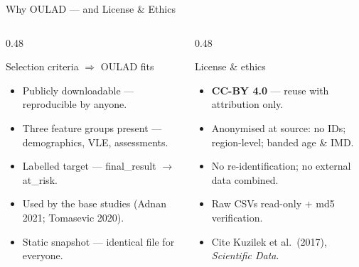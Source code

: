 \documentclass[aspectratio=169,10pt]{beamer}
\newcommand{\tcode}[1]{{\ttfamily #1}}
\begin{document}
\begin{frame}{Why OULAD — and License \& Ethics}
  \begin{columns}[t,onlytextwidth]
    \begin{column}{0.48\textwidth}
      \begin{block}{Selection criteria $\Rightarrow$ OULAD fits}
        \scriptsize
        \begin{itemize}\setlength\itemsep{0.25em}
          \item Publicly downloadable — reproducible by anyone.
          \item Three feature groups present — demographics, VLE, assessments.
          \item Labelled target — \tcode{final\_result} $\to$ \tcode{at\_risk}.
          \item Used by the base studies (Adnan 2021; Tomasevic 2020).
          \item Static snapshot — identical file for everyone.
        \end{itemize}
      \end{block}
    \end{column}
    \begin{column}{0.48\textwidth}
      \begin{block}{License \& ethics}
        \scriptsize
        \begin{itemize}\setlength\itemsep{0.25em}
          \item \textbf{CC-BY 4.0} — reuse with attribution only.
          \item Anonymised at source: no IDs; region-level; banded age \& IMD.
          \item No re-identification; no external data combined.
          \item Raw CSVs read-only + md5 verification.
          \item Cite Kuzilek et al.\ (2017), \emph{Scientific Data}.
        \end{itemize}
      \end{block}
    \end{column}
  \end{columns}
\end{frame}

\end{document}
